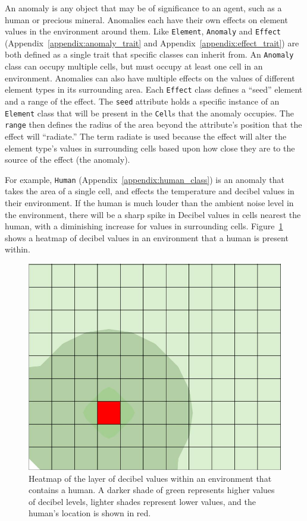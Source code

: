 An anomaly is any object that may be of significance to an agent, such as a human or precious mineral.
Anomalies each have their own effects on element values in the environment around them.
Like \texttt{Element}, \texttt{Anomaly} and \texttt{Effect} (Appendix~\ref{appendix:anomaly_trait} and Appendix~\ref{appendix:effect_trait}) are both defined as a single trait that specific classes can inherit from.
An \texttt{Anomaly} class can occupy multiple cells, but must occupy at least one cell in an environment.
Anomalies can also have multiple effects on the values of different element types in its surrounding area.
Each \texttt{Effect} class defines a ``seed'' element and a range of the effect.
The \texttt{seed} attribute holds a specific instance of an \texttt{Element} class that will be present in the \texttt{Cell}s that the anomaly occupies.
The \texttt{range} then defines the radius of the area beyond the attribute's position that the effect will ``radiate.''
The term radiate is used because the effect will alter the element type's values in surrounding cells based upon how close they are to the source of the effect (the anomaly).

For example, \texttt{Human} (Appendix~\ref{appendix:human_class}) is an anomaly that takes the area of a single cell, and effects the temperature and decibel values in their environment.
If the human is much louder than the ambient noise level in the environment, there will be a sharp spike in Decibel values in cells nearest the human, with a diminishing increase for values in surrounding cells.
Figure~\ref{fig:human_decibel_effect} shows a heatmap of decibel values in an environment that a human is present within.

\begin{figure}[H]
  \centering
  \includegraphics[width=0.6\columnwidth]{Figures/human_decibel_effect.JPG}
  \caption{Heatmap of the layer of decibel values within an environment that contains a human. A darker shade of green represents higher values of decibel levels, lighter shades represent lower values, and the human's location is shown in red.}
  \label{fig:human_decibel_effect}
\end{figure}

